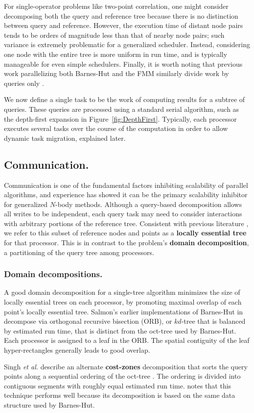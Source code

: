 \documentclass[twoside,leqno,twocolumn]{article}
\newcommand{\fig}[1]{Figure~\ref{fig:#1}}
\newcommand{\mysubsub}[1]{\subsubsection{#1.}}
\newcommand{\mysub}[1]{\subsection{#1.}}
\newcommand{\defterm}[1]{{\bf #1}}
\begin{document}
For single-operator problems like two-point correlation, one might consider decomposing both the query and reference tree because there is no distinction between query and reference.
However, the execution time of distant node pairs tends to be orders of magnitude less than that of nearby node pairs; such variance is extremely problematic for a generalized scheduler.
Instead, considering one node with the entire tree is more uniform in run time, and is typically manageable for even simple schedulers.
Finally, it is worth noting that previous work parallelizing both Barnes-Hut and the FMM similarly divide work by queries only \cite{liu94experiences, salmon_thesis, singh_thesis}.

We now define a single task to be the work of computing results for a subtree of queries.
These queries are processed using a standard serial algorithm, such as the depth-first expansion in \fig{DepthFirst}.
Typically, each processor executes several tasks over the course of the computation in order to allow dynamic task migration, explained later.

\mysub{Communication}

Communication is one of the fundamental factors inhibiting scalability of parallel algorithms, and experience has showed it can be the primary scalability inhibitor for generalized $N$-body methods.
Although a query-based decomposition allows all writes to be independent, each query task may need to consider interactions with arbitrary portions of the reference tree.
Consistent with previous literature \cite{salmon_thesis, singh_thesis}, we refer to this subset of reference nodes and points as a \defterm{locally essential tree} for that processor.
This is in contrast to the problem's \defterm{domain decomposition}, a partitioning of the query tree among processors.

\mysubsub{Domain decompositions}
A good domain decomposition for a single-tree algorithm minimizes the size of locally essential trees on each processor, by promoting maximal overlap of each point's locally essential tree.
Salmon's earlier implementations of Barnes-Hut in \cite{salmon_thesis} decompose via orthogonal recursive bisection (ORB), or $kd$-tree that is balanced by estimated run time, that is distinct from the oct-tree used by Barnes-Hut.
Each processor is assigned to a leaf in the ORB.
The spatial contiguity of the leaf hyper-rectangles generally leads to good overlap.

Singh {\it et al.} describe an alternate \defterm{cost-zones} decomposition that sorts the query points along a sequential ordering of the oct-tree \cite{singh95load}.
The ordering is divided into contiguous segments with roughly equal estimated run time.
\cite{singh95load} notes that this technique performs well because its decomposition is based on the same data structure used by Barnes-Hut.
\end{document}
